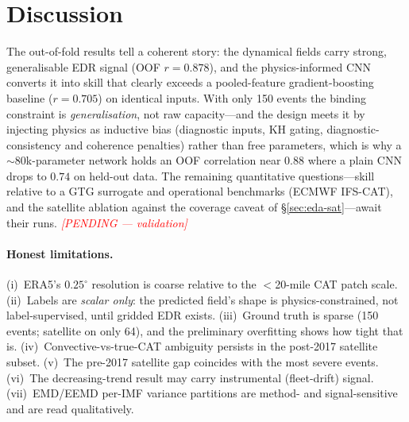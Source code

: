 \documentclass[11pt]{article}
\newcommand{\todo}[1]{\textit{\textcolor{red}{[PENDING --- #1]}}}
\begin{document}
\section{Discussion}
\label{sec:discussion}
The out-of-fold results tell a coherent story: the dynamical fields carry
strong, generalisable EDR signal (OOF $r=0.878$), and the physics-informed
CNN converts it into skill that clearly exceeds a pooled-feature
gradient-boosting baseline ($r=0.705$) on identical inputs. With only 150
events the binding constraint is \emph{generalisation}, not raw
capacity---and the design meets it by injecting physics as inductive bias
(diagnostic inputs, KH gating, diagnostic-consistency and coherence
penalties) rather than free parameters, which is why a $\sim$80k-parameter
network holds an OOF correlation near $0.88$ where a plain CNN drops to
$0.74$ on held-out data. The remaining quantitative questions---skill
relative to a GTG surrogate and operational benchmarks (ECMWF IFS-CAT),
and the satellite ablation against the coverage caveat of
\S\ref{sec:eda-sat}---await their runs. \todo{validation}

\paragraph{Honest limitations.}
(i)~ERA5's $0.25^\circ$ resolution is coarse relative to the $<$20-mile
CAT patch scale. (ii)~Labels are \emph{scalar only}: the predicted field's
shape is physics-constrained, not label-supervised, until gridded EDR
exists. (iii)~Ground truth is sparse (150 events; satellite on only 64),
and the preliminary overfitting shows how tight that is.
(iv)~Convective-vs-true-CAT ambiguity persists in the post-2017 satellite
subset. (v)~The pre-2017 satellite gap coincides with the most severe
events. (vi)~The decreasing-trend result may carry instrumental
(fleet-drift) signal. (vii)~EMD/EEMD per-IMF variance partitions are
method- and signal-sensitive and are read qualitatively.

\end{document}
